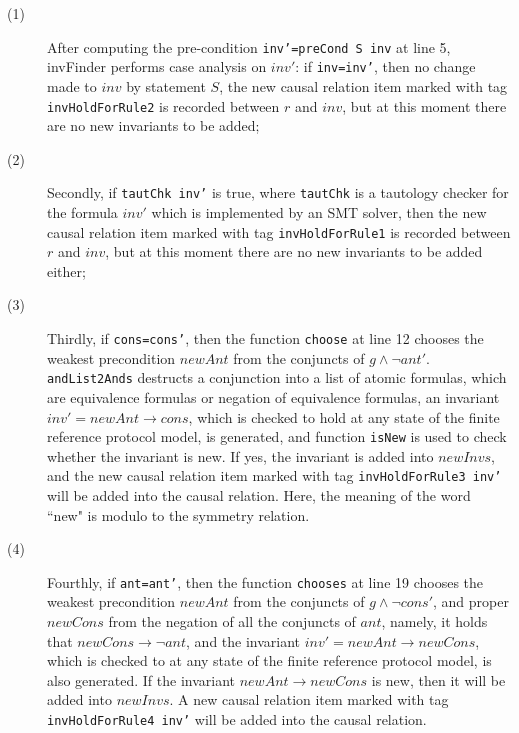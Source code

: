\documentclass{llncs}
\begin{document}
\begin{description}
\item[(1)] After computing the pre-condition {\tt inv'=preCond~S~inv} at line 5,
{\sf invFinder} performs case analysis on $inv'$: if {\tt inv=inv'},
 then no change made to $inv$ by statement $S$, the new causal
relation item marked with tag {\tt invHoldForRule2} is recorded
between $r$ and $inv$, but at this moment there are no new
invariants to be added;

\item[(2)] Secondly, if {\tt tautChk inv'} is true, where {\tt tautChk} is
a tautology checker for the formula $inv'$ which is implemented by
an SMT solver, then the new causal relation item marked with tag
{\tt invHoldForRule1} is recorded between $r$ and $inv$, but at this
moment there are no new invariants to be added either;

 \item[(3)] Thirdly, if {\tt cons=cons'},
 then the function {\tt choose} at line 12 chooses the weakest precondition $newAnt$
 from the conjuncts of  $g \wedge \neg  ant'$.
 {\tt andList2Ands} destructs a conjunction into a list of atomic formulas,
 which are equivalence formulas or negation of equivalence formulas,
 an invariant $inv'=newAnt \longrightarrow cons$,
 which is checked to hold at any state of the finite reference protocol model,
 is generated, and function {\tt isNew} is used to check whether the invariant is new.
 If yes, the invariant is  added into $newInvs$,
 and the new causal relation item marked with tag {\tt invHoldForRule3 inv'} will be added into the causal relation.
Here, the meaning of the word ``new" is modulo to the symmetry relation.

  \item[(4)] Fourthly, if {\tt ant=ant'}, then the function {\tt chooses} at line 19 chooses
  the weakest precondition $newAnt$ from the conjuncts of
   $g \wedge \neg  cons'$, and proper $newCons$ from the negation of all the conjuncts of $ant$,
   namely, it holds that $newCons \longrightarrow \neg ant$,
   and the invariant  $inv'=newAnt \longrightarrow newCons$,
   which is checked to  at any state of the finite reference protocol model,  is also generated.
   If the invariant $newAnt \longrightarrow newCons$ is new, then it will be added into $newInvs$.
   A new causal relation item marked with tag {\tt invHoldForRule4 inv'} will be added into the causal
   relation.


\end{description}
\end{document}
